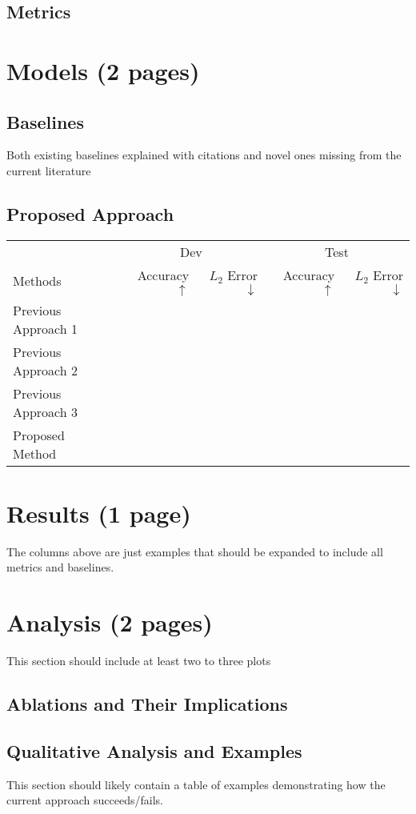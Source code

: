 \documentclass[11pt,a4paper]{article}
\begin{document}
\subsection{Metrics}

\clearpage
\section{Models (2 pages)}

\subsection{Baselines}
Both existing baselines explained with citations and novel ones missing from the current literature

\subsection{Proposed Approach}

\clearpage
\begin{table*}[t]
\centering
\begin{tabular}{lrrrr}
\toprule
                            & \multicolumn{2}{c}{Dev} & \multicolumn{2}{c}{Test}\\
Methods                     & Accuracy $\uparrow$ & $L_2$ Error $\downarrow$ & Accuracy $\uparrow$ & $L_2$ Error $\downarrow$ \\
\midrule
Previous Approach 1 \cite{} & & & & \\
Previous Approach 2 \cite{} & & & & \\
Previous Approach 3 \cite{} & & & & \\
\midrule
Proposed Method             & & & & \\
\bottomrule
\end{tabular}
\end{table*}
\section{Results (1 page)}
The columns above are just examples that should be expanded to include all metrics and baselines.

\clearpage
\section{Analysis (2 pages)}
This section should include at least two to three plots
\subsection{Ablations and Their Implications}

\subsection{Qualitative Analysis and Examples}
This section should likely contain a table of examples demonstrating how the current approach succeeds/fails.




\end{document}
